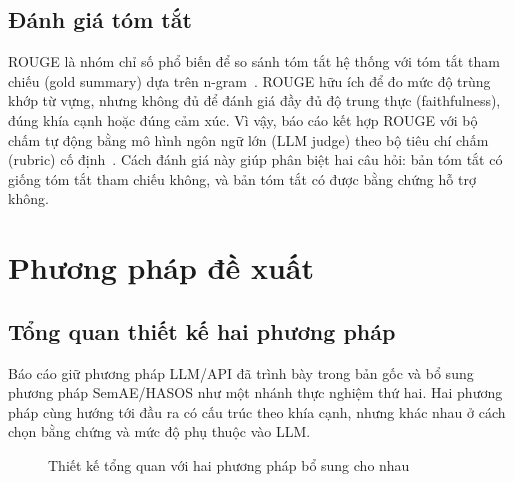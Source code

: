 \documentclass[12pt,a4paper]{report}
\begin{document}
\section{Đánh giá tóm tắt}

ROUGE là nhóm chỉ số phổ biến để so sánh tóm tắt hệ thống với tóm tắt tham chiếu (gold summary) dựa trên n-gram~\cite{lin2004rouge}. ROUGE hữu ích để đo mức độ trùng khớp từ vựng, nhưng không đủ để đánh giá đầy đủ độ trung thực (faithfulness), đúng khía cạnh hoặc đúng cảm xúc. Vì vậy, báo cáo kết hợp ROUGE với bộ chấm tự động bằng mô hình ngôn ngữ lớn (LLM judge) theo bộ tiêu chí chấm (rubric) cố định~\cite{liu2023geval,zheng2023judging}. Cách đánh giá này giúp phân biệt hai câu hỏi: bản tóm tắt có giống tóm tắt tham chiếu không, và bản tóm tắt có được bằng chứng hỗ trợ không.

\chapter{Phương pháp đề xuất}

\section{Tổng quan thiết kế hai phương pháp}

Báo cáo giữ phương pháp LLM/API đã trình bày trong bản gốc và bổ sung phương pháp SemAE/HASOS như một nhánh thực nghiệm thứ hai. Hai phương pháp cùng hướng tới đầu ra có cấu trúc theo khía cạnh, nhưng khác nhau ở cách chọn bằng chứng và mức độ phụ thuộc vào LLM.

\begin{figure}[tbp]
\centering
{}
\caption{Thiết kế tổng quan với hai phương pháp bổ sung cho nhau}
\label{fig:two-method-overview}
\end{figure}
\end{document}
